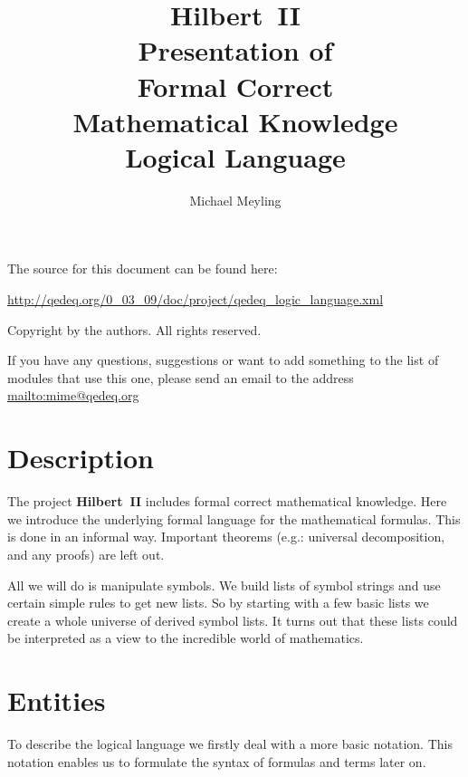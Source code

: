 \documentclass[a4paper,german,10pt,twoside]{book}
\title{\textbf{Hilbert~II} \\
\vspace*{1cm} 
Presentation of \\ 
Formal Correct \\
Mathematical Knowledge \\
\vspace*{1cm} Logical Language}
\author{
Michael Meyling
}
\theoremstyle{definition}
\theoremstyle{remark}
\begin{document}
\maketitle

\setlength{\parskip}{5pt plus 2pt minus 1pt}
\mbox{}
\vfill

\par
The source for this document can be found here:
\par
\url{http://qedeq.org/0_03_09/doc/project/qedeq_logic_language.xml}

\par
Copyright by the authors. All rights reserved.
\par
If you have any questions, suggestions or want to add something to the list of modules that use this one, please send an email to the address \url{mailto:mime@qedeq.org}

\setlength{\parskip}{0pt}
\tableofcontents

\setlength{\parskip}{5pt plus 2pt minus 1pt}

\chapter*{Description} \label{chapter0} \hypertarget{chapter0}{}

The project \textbf{Hilbert~II} includes formal correct mathematical knowledge. Here we introduce the underlying formal language for the mathematical formulas. This is done in an informal way. Important theorems (e.g.: universal decomposition, and any proofs) are left out.

\par
All we will do is manipulate symbols. We build lists of symbol strings and use certain simple rules to get new lists. So by starting with a few basic lists we create a whole universe of derived symbol lists. 
It turns out that these lists could be interpreted as a view to the incredible world of mathematics.


\chapter{Entities} \label{chapter1} \hypertarget{chapter1}{}

To describe the logical language we firstly deal with a more basic notation. This notation enables us to formulate the syntax of formulas and terms later on.
\end{document}

